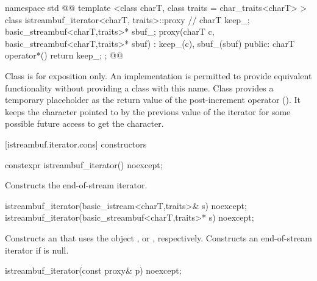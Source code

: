 %
\begin{codeblock}
namespace std { @@
  template <class charT, class traits = char_traits<charT> >
  class istreambuf_iterator<charT, traits>::proxy { // \expos
    charT keep_;
    basic_streambuf<charT,traits>* sbuf_;
    proxy(charT c, basic_streambuf<charT,traits>* sbuf)
      : keep_(c), sbuf_(sbuf) { }
  public:
    charT operator*() { return keep_; }
  };
}@\newtxt{\}\}\}}@
\end{codeblock}

\pnum
Class
is for exposition only.
An implementation is permitted to provide equivalent functionality without
providing a class with this name.
Class
provides a temporary
placeholder as the return value of the post-increment operator
().
It keeps the character pointed to by the previous value
of the iterator for some possible future access to get the character.

[istreambuf.iterator.cons]{ constructors}


%
\begin{itemdecl}
constexpr istreambuf_iterator() noexcept;
\end{itemdecl}

\begin{itemdescr}
\pnum
\effects
Constructs the end-of-stream iterator.
\end{itemdescr}


%
\begin{itemdecl}
istreambuf_iterator(basic_istream<charT,traits>& s) noexcept;
istreambuf_iterator(basic_streambuf<charT,traits>* s) noexcept;
\end{itemdecl}

\begin{itemdescr}
\pnum
\effects
Constructs an
that uses the
object
,
or
,
respectively.
Constructs an end-of-stream iterator if
is null.
\end{itemdescr}


%
\begin{itemdecl}
istreambuf_iterator(const proxy& p) noexcept;
\end{itemdecl}

